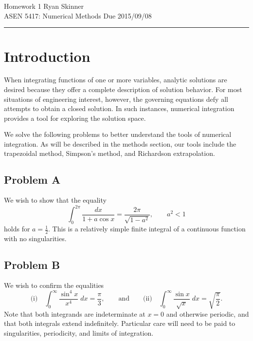 \documentclass[12pt]{article}
\begin{document}
\pagestyle{fancyplain}
\lhead{}
\chead{}
\rhead{}
\cfoot{\thepage}

\noindent
{\Large Homework 1}
\hfill
{\large Ryan Skinner}
\\[0.5ex]
{\large ASEN 5417: Numerical Methods}
\hfill
{\large Due 2015/09/08}\\
\hrule
\vspace{12pt}

\section{Introduction}

When integrating functions of one or more variables, analytic solutions are desired because they offer a complete description of solution behavior. For most situations of engineering interest, however, the governing equations defy all attempts to obtain a closed solution. In such instances, numerical integration provides a tool for exploring the solution space.

We solve the following problems to better understand the tools of numerical integration. As will be described in the methods section, our tools include the trapezoidal method, Simpson's method, and Richardson extrapolation.

\subsection{Problem A}

We wish to show that the equality
\begin{equation}
\int_{0}^{2\pi} \frac{dx}{1 + a \cos x} = \frac{2\pi}{\sqrt{1-a^2}}, \qquad a^2 < 1
\label{eq:a}
\end{equation}
holds for $a = \tfrac{1}{2}$. This is a relatively simple finite integral of a continuous function with no singularities.

\subsection{Problem B}

We wish to confirm the equalities
\begin{equation}
\text{(i)} \quad
\int_{0}^{\infty} \frac{\sin^4 x}{x^4} \; dx = \frac{\pi}{3}
,
\qquad
\text{and}
\qquad
\text{(ii)} \quad
\int_{0}^{\infty} \frac{\sin x}{\sqrt{x}} \; dx = \sqrt{\frac{\pi}{2}}
.
\label{eq:b}
\end{equation}
Note that both integrands are indeterminate at $x=0$ and otherwise periodic, and that both integrals extend indefinitely. Particular care will need to be paid to singularities, periodicity, and limits of integration.
\end{document}
